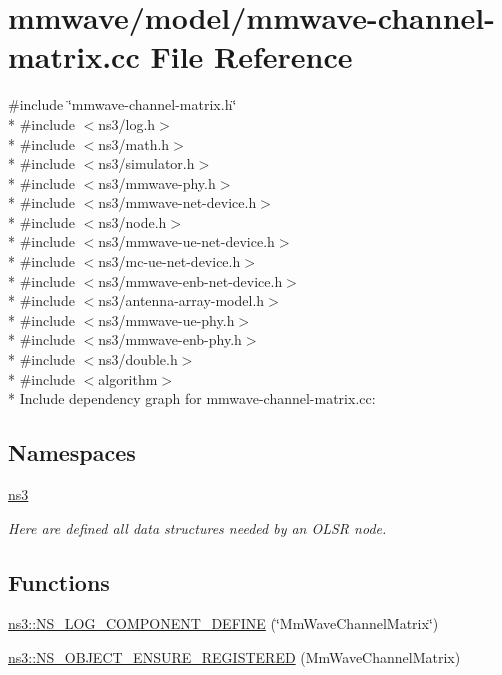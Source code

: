 \hypertarget{mmwave-channel-matrix_8cc}{}\section{mmwave/model/mmwave-\/channel-\/matrix.cc File Reference}
\label{mmwave-channel-matrix_8cc}
{\ttfamily \#include \char`\"{}mmwave-\/channel-\/matrix.\+h\char`\"{}}\\*
{\ttfamily \#include $<$ns3/log.\+h$>$}\\*
{\ttfamily \#include $<$ns3/math.\+h$>$}\\*
{\ttfamily \#include $<$ns3/simulator.\+h$>$}\\*
{\ttfamily \#include $<$ns3/mmwave-\/phy.\+h$>$}\\*
{\ttfamily \#include $<$ns3/mmwave-\/net-\/device.\+h$>$}\\*
{\ttfamily \#include $<$ns3/node.\+h$>$}\\*
{\ttfamily \#include $<$ns3/mmwave-\/ue-\/net-\/device.\+h$>$}\\*
{\ttfamily \#include $<$ns3/mc-\/ue-\/net-\/device.\+h$>$}\\*
{\ttfamily \#include $<$ns3/mmwave-\/enb-\/net-\/device.\+h$>$}\\*
{\ttfamily \#include $<$ns3/antenna-\/array-\/model.\+h$>$}\\*
{\ttfamily \#include $<$ns3/mmwave-\/ue-\/phy.\+h$>$}\\*
{\ttfamily \#include $<$ns3/mmwave-\/enb-\/phy.\+h$>$}\\*
{\ttfamily \#include $<$ns3/double.\+h$>$}\\*
{\ttfamily \#include $<$algorithm$>$}\\*
Include dependency graph for mmwave-\/channel-\/matrix.cc\+:
\subsection*{Namespaces}
\begin{DoxyCompactItemize}
\item 
 \hyperlink{namespacens3}{ns3}
\begin{DoxyCompactList}\small\item\em Here are defined all data structures needed by an O\+L\+SR node. \end{DoxyCompactList}\end{DoxyCompactItemize}
\subsection*{Functions}
\begin{DoxyCompactItemize}
\item 
\hyperlink{namespacens3_ab952f7c21fcb5f9ac9e7458d46998c20}{ns3\+::\+N\+S\+\_\+\+L\+O\+G\+\_\+\+C\+O\+M\+P\+O\+N\+E\+N\+T\+\_\+\+D\+E\+F\+I\+NE} (\char`\"{}Mm\+Wave\+Channel\+Matrix\char`\"{})
\item 
\hyperlink{namespacens3_a17e9261ef8556eebe7d8ff8301d2eea7}{ns3\+::\+N\+S\+\_\+\+O\+B\+J\+E\+C\+T\+\_\+\+E\+N\+S\+U\+R\+E\+\_\+\+R\+E\+G\+I\+S\+T\+E\+R\+ED} (Mm\+Wave\+Channel\+Matrix)
\end{DoxyCompactItemize}
